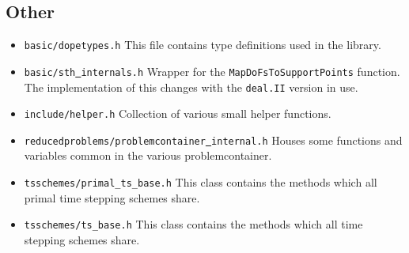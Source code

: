 \subsection{Other}
\begin{itemize}
  \item \texttt{basic/dopetypes.h} This file contains type definitions used in the library. 
\item \texttt{basic/sth\underline{ }internals.h} Wrapper for the \texttt{MapDoFsToSupportPoints} function. The implementation of this changes with the \texttt{deal.II} version in use.
\item \texttt{include/helper.h} Collection of various small helper functions.
\item \texttt{reducedproblems/problemcontainer\underline{ }internal.h} Houses some functions and variables common in the various problemcontainer.
\item \texttt{tsschemes/primal\_ts\_base.h}  This class contains the methods which all primal time stepping schemes share.
\item \texttt{tsschemes/ts\_base.h}  This class contains the methods which all time stepping schemes share.
\end{itemize}
